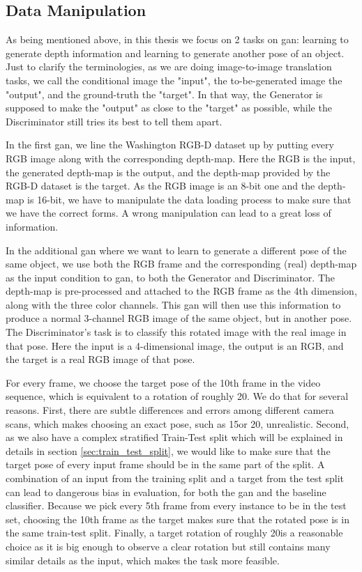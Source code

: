 \subsection{Data Manipulation}

As being mentioned above, in this thesis we focus on 2 tasks on \acrshort{gan}: learning
to generate depth information and learning to generate another pose of an object. Just to
clarify the terminologies, as we are doing image-to-image translation tasks, we call the
conditional image the "input", the to-be-generated image the "output", and the
ground-truth the "target". In that way, the Generator is supposed to make the "output" as
close to the "target" as possible, while the Discriminator still tries its best to tell
them apart.

In the first \acrshort{gan}, we line the Washington RGB-D dataset up by putting every RGB
image along with the corresponding depth-map. Here the RGB is the input, the generated
depth-map is the output, and the depth-map provided by the RGB-D dataset is the target. As
the RGB image is an 8-bit one and the depth-map is 16-bit, we have to manipulate the data
loading process to make sure that we have the correct forms. A wrong manipulation can lead
to a great loss of information.

In the additional \acrshort{gan} where we want to learn to generate a different pose of
the same object, we use both the RGB frame and the corresponding (real) depth-map as the
input condition to \acrshort{gan}, to both the Generator and Discriminator. The depth-map
is pre-processed and attached to the RGB frame as the 4th dimension, along with the three
color channels. This \acrshort{gan} will then use this information to produce a normal
3-channel RGB image of the same object, but in another pose. The Discriminator's task is
to classify this rotated image with the real image in that pose. Here the input is a
4-dimensional image, the output is an RGB, and the target is a real RGB image of that
pose.

For every frame, we choose the target pose of the 10th frame in the video sequence, which
is equivalent to a rotation of roughly 20\degree. We do that for several reasons. First,
there are subtle differences and errors among different camera scans, which makes choosing
an exact pose, such as 15\degree or 20\degree, unrealistic. Second, as we also have a
complex stratified Train-Test split which will be explained in details in section
\ref{sec:train_test_split}, we would like to make sure that the target pose of every input
frame should be in the same part of the split. A combination of an input from the training
split and a target from the test split can lead to dangerous bias in evaluation, for both
the \acrshort{gan} and the baseline classifier. Because we pick every 5th frame from every
instance to be in the test set, choosing the 10th frame as the target makes sure that the
rotated pose is in the same train-test split. Finally, a target rotation of
roughly 20\degree is a reasonable choice as it is big enough to observe a clear rotation
but still contains many similar details as the input, which makes the task more feasible.

